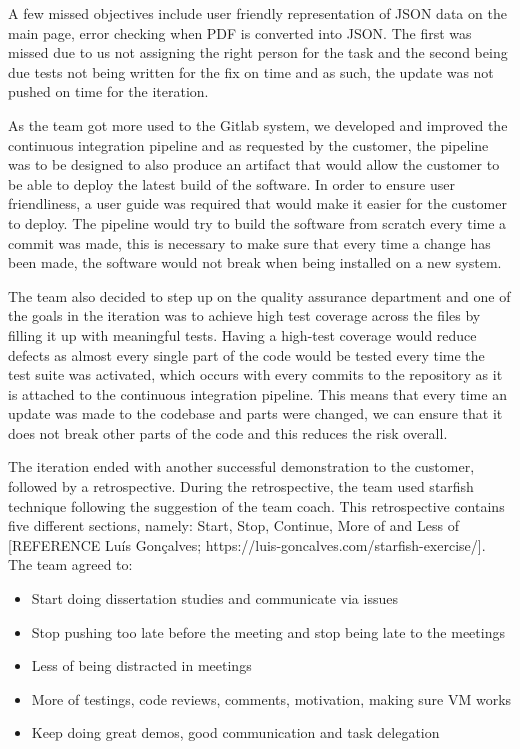 \documentclass{l3proj}
\begin{document}
A few missed objectives include user friendly representation of JSON data on the main page, error checking when PDF is converted into JSON. The first was missed due to us not assigning the right person for the task and the second being due tests not being written for the fix on time and as such, the update was not pushed on time for the iteration.

As the team got more used to the Gitlab system, we developed and improved the continuous integration pipeline and as requested by the customer, the pipeline was to be designed to also produce an artifact that would allow the customer to be able to deploy the latest build of the software. In order to ensure user friendliness, a user guide was required that would make it easier for the customer to deploy. The pipeline would try to build the software from scratch every time a commit was made, this is necessary to make sure that every time a change has been made, the software would not break when being installed on a new system.

The team also decided to step up on the quality assurance department and one of the goals in the iteration was to achieve high test coverage across the files by filling it up with meaningful tests. Having a high-test coverage would reduce defects as almost every single part of the code would be tested every time the test suite was activated, which occurs with every commits to the repository as it is attached to the continuous integration pipeline. This means that every time an update was made to the codebase and parts were changed, we can ensure that it does not break other parts of the code and this reduces the risk overall.

The iteration ended with another successful demonstration to the customer, followed by a retrospective. During the retrospective, the team used starfish technique following the suggestion of the team coach. This retrospective contains five different sections, namely: Start, Stop, Continue, More of and Less of [REFERENCE Luís Gonçalves; https://luis-goncalves.com/starfish-exercise/]. The team agreed to:

\begin{itemize}
\item Start doing dissertation studies and communicate via issues
\item Stop pushing too late before the meeting and stop being late to the meetings
\item Less of being distracted in meetings
\item More of testings, code reviews, comments, motivation, making sure VM works
\item Keep doing great demos, good communication and task delegation
\end{itemize}
\end{document}
